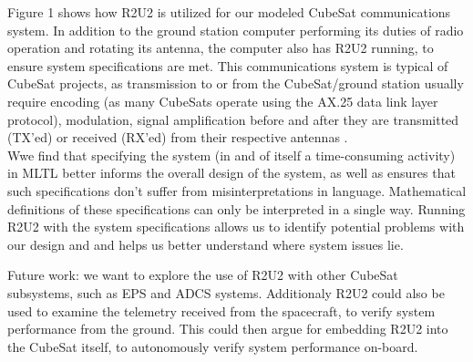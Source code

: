 \documentclass[conf]{new-aiaa}
\begin{document}
Figure 1 shows how R2U2 is utilized for our modeled CubeSat communications system. In addition to the ground station computer performing its duties of radio operation and rotating its antenna, the computer also has R2U2 running, to ensure system specifications are met. This communications system is typical of CubeSat projects, as transmission to or from the CubeSat/ground station usually require encoding (as many CubeSats operate using the AX.25 data link layer protocol), modulation, signal amplification before and after they are transmitted (TX'ed) or received (RX'ed) from their respective antennas \cite{Asundi2013}.\\

Wwe find that specifying the system (in and of itself a time-consuming activity) in MLTL better informs the overall design of the system, as well as ensures that such specifications don't suffer from misinterpretations in language. Mathematical definitions of these specifications can only be interpreted in a single way. Running R2U2 with the system specifications allows us to identify potential problems with our design and and helps us better understand where system issues lie.

Future work: we want to explore the use of R2U2 with other CubeSat subsystems, such as EPS and ADCS systems. Additionaly R2U2 could also be used to examine the telemetry received from the spacecraft, to verify system performance from the ground. This could then argue for embedding R2U2 into the CubeSat itself, to autonomously verify system performance on-board.

\end{document}
